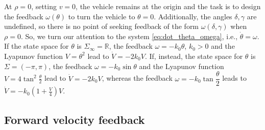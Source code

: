 \documentclass[journal,twoside,web]{ieeecolor}
\theoremstyle{definition}
\begin{document}
At $\rho=0$, setting $v=0$, the vehicle remains at the origin and the task is to design the feedback $\omega(\theta)$ to turn the vehicle to $\theta=0$. Additionally, the angles $\delta,\gamma$ are undefined, so there is no point of seeking feedback of the form $\omega(\delta,\gamma)$ when $\rho=0$. 
So, we turn our attention to the system \eqref{eq:dot_theta_omega}, i.e., 
$\dot{\theta} = \omega$. 
If the state space for $\theta$ is $\Sigma_\infty = \mathbb{R}$, the feedback 
$\omega = -k_0 \theta$, $k_0 > 0$
and the Lyapunov function $V= \theta^2$ lead to $\dot V = - 2k_0 V$. If, instead, the state space for $\theta$ is $\Sigma=(-\pi,\pi)$, 
the feedback
$\omega = -k_0\sin\theta$
and the Lyapunov function $V= 4 \tan^2 \frac{\theta}{2}$ lead to $\dot V = - 2k_0 V$, whereas
the feedback
$\omega = -k_0\tan\dfrac{\theta}{2}$
leads to $\dot V = - k_0\left(1+\frac{V}{4}\right) V$. 

\subsection{Forward velocity feedback}
\label{sec:forward_velocity_feedback}
\end{document}
